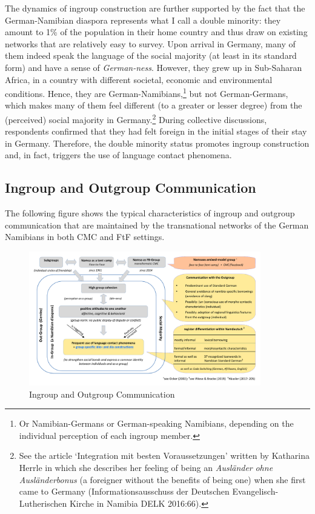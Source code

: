 \documentclass[output=paper]{langsci/langscibook}
\begin{document}
The dynamics of ingroup construction are further supported by the fact that the German-Namibian diaspora represents what I call a double minority: they amount to 1\% of the population in their home country and thus draw on existing networks that are relatively easy to survey. Upon arrival in Germany, many of them indeed speak the language of the social majority (at least in its standard form) and have a sense of \textit{German-ness}. However, they grew up in Sub-Saharan Africa, in a country with different societal, economic and environmental conditions. Hence, they are German-Namibians,\footnote{Or Namibian-Germans or German-speaking Namibians, depending on the individual perception of each ingroup member.}  but not German-Germans, which makes many of them feel different (to a greater or lesser degree) from the (perceived) social majority in Germany.\footnote{See the article ‘Integration mit besten Voraussetzungen’ written by Katharina Herrle in which she describes her feeling of being an \textit{Ausländer} \textit{ohne} \textit{Ausländerbonus} (a foreigner without the benefits of being one) when she first came to Germany (Informationsausschuss der Deutschen Evangelisch-Lutherischen Kirche in Namibia DELK 2016:66).} During collective discussions, respondents confirmed that they had felt foreign in the initial stages of their stay in Germany. Therefore, the double minority status promotes ingroup construction and, in fact, triggers the use of language contact phenomena. 

 
   
\subsection{Ingroup and Outgroup Communication}
  \label{sec:radke:3.2}
 

The following figure shows the typical characteristics of ingroup and outgroup communication that are maintained by the transnational networks of the German Namibians in both CMC and FtF settings. 

\begin{figure}
 \includegraphics[width=0.9\textwidth]{figures/radkefig2-c.pdf}
\caption{Ingroup and Outgroup Communication}
\label{fig:radke:2}
\end{figure}  
\end{document}
